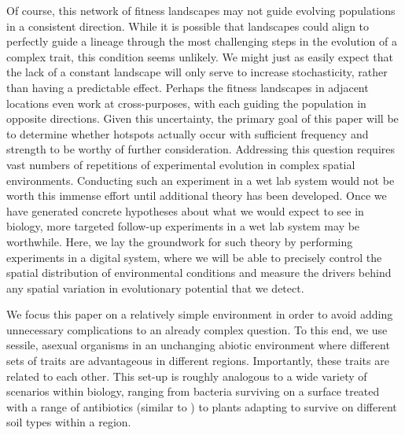 Of course, this network of fitness landscapes may not guide evolving populations in a consistent direction. While it is possible that landscapes could align to perfectly guide a lineage through the most challenging steps in the evolution of a complex trait, this condition seems unlikely. We might just as easily expect that the lack of a constant landscape will only serve to increase stochasticity, rather than having a predictable effect. Perhaps the fitness landscapes in adjacent locations even work at cross-purposes, with each guiding the population in opposite directions. Given this uncertainty, the primary goal of this paper will be to determine whether hotspots actually occur with sufficient frequency and strength to be worthy of further consideration. Addressing this question requires vast numbers of repetitions of experimental evolution in complex spatial environments. Conducting such an experiment in a wet lab system would not be worth this immense effort until additional theory has been developed. Once we have generated concrete hypotheses about what we would expect to see in biology, more targeted follow-up experiments in a wet lab system may be worthwhile. Here, we lay the groundwork for such theory by performing experiments in a digital system, where we will be able to precisely control the spatial distribution of environmental conditions and measure the drivers behind any spatial variation in evolutionary potential that we detect.

We focus this paper on a relatively simple environment in order to avoid adding unnecessary complications to an already complex question. To this end, we use sessile, asexual  organisms in an unchanging abiotic environment where different sets of traits are advantageous in different regions. Importantly, these traits are related to each other. This set-up is roughly analogous to a wide variety of scenarios within biology, ranging from bacteria surviving on a surface treated with a range of antibiotics (similar to \citep{baym_spatiotemporal_2016}) to plants adapting to survive on different soil types within a region. 



